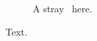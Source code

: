 \documentclass{article}
\begin{document}
\begin{figure}
\caption{A stray \fi\ here.}
\label{f:a}
\end{figure}
Text.
\end{document}
